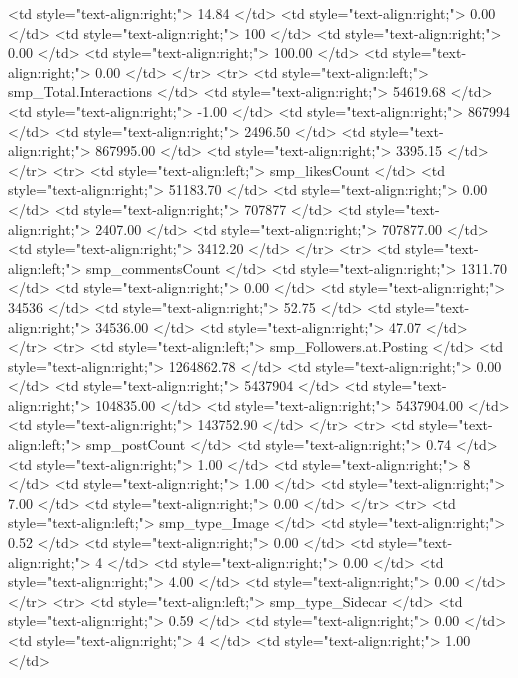    <td style="text-align:right;"> 14.84 </td>
   <td style="text-align:right;"> 0.00 </td>
   <td style="text-align:right;"> 100 </td>
   <td style="text-align:right;"> 0.00 </td>
   <td style="text-align:right;"> 100.00 </td>
   <td style="text-align:right;"> 0.00 </td>
  </tr>
  <tr>
   <td style="text-align:left;"> smp_Total.Interactions </td>
   <td style="text-align:right;"> 54619.68 </td>
   <td style="text-align:right;"> -1.00 </td>
   <td style="text-align:right;"> 867994 </td>
   <td style="text-align:right;"> 2496.50 </td>
   <td style="text-align:right;"> 867995.00 </td>
   <td style="text-align:right;"> 3395.15 </td>
  </tr>
  <tr>
   <td style="text-align:left;"> smp_likesCount </td>
   <td style="text-align:right;"> 51183.70 </td>
   <td style="text-align:right;"> 0.00 </td>
   <td style="text-align:right;"> 707877 </td>
   <td style="text-align:right;"> 2407.00 </td>
   <td style="text-align:right;"> 707877.00 </td>
   <td style="text-align:right;"> 3412.20 </td>
  </tr>
  <tr>
   <td style="text-align:left;"> smp_commentsCount </td>
   <td style="text-align:right;"> 1311.70 </td>
   <td style="text-align:right;"> 0.00 </td>
   <td style="text-align:right;"> 34536 </td>
   <td style="text-align:right;"> 52.75 </td>
   <td style="text-align:right;"> 34536.00 </td>
   <td style="text-align:right;"> 47.07 </td>
  </tr>
  <tr>
   <td style="text-align:left;"> smp_Followers.at.Posting </td>
   <td style="text-align:right;"> 1264862.78 </td>
   <td style="text-align:right;"> 0.00 </td>
   <td style="text-align:right;"> 5437904 </td>
   <td style="text-align:right;"> 104835.00 </td>
   <td style="text-align:right;"> 5437904.00 </td>
   <td style="text-align:right;"> 143752.90 </td>
  </tr>
  <tr>
   <td style="text-align:left;"> smp_postCount </td>
   <td style="text-align:right;"> 0.74 </td>
   <td style="text-align:right;"> 1.00 </td>
   <td style="text-align:right;"> 8 </td>
   <td style="text-align:right;"> 1.00 </td>
   <td style="text-align:right;"> 7.00 </td>
   <td style="text-align:right;"> 0.00 </td>
  </tr>
  <tr>
   <td style="text-align:left;"> smp_type_Image </td>
   <td style="text-align:right;"> 0.52 </td>
   <td style="text-align:right;"> 0.00 </td>
   <td style="text-align:right;"> 4 </td>
   <td style="text-align:right;"> 0.00 </td>
   <td style="text-align:right;"> 4.00 </td>
   <td style="text-align:right;"> 0.00 </td>
  </tr>
  <tr>
   <td style="text-align:left;"> smp_type_Sidecar </td>
   <td style="text-align:right;"> 0.59 </td>
   <td style="text-align:right;"> 0.00 </td>
   <td style="text-align:right;"> 4 </td>
   <td style="text-align:right;"> 1.00 </td>
